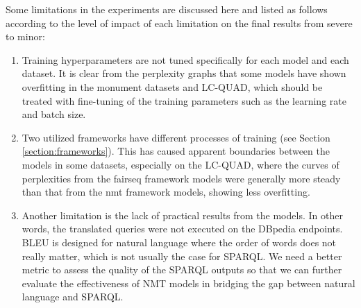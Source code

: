 Some limitations in the experiments are discussed here and listed as follows according to the level of impact of each limitation on the final results from severe to minor:
\begin{enumerate}
\item Training hyperparameters are not tuned specifically for each model and each dataset. It is clear from the perplexity graphs that some models have shown overfitting in the monument datasets and LC-QUAD, which should be treated with fine-tuning of the training parameters such as the learning rate and batch size.
\item Two utilized frameworks have different processes of training (see Section \ref{section:frameworks}). This has caused apparent boundaries between the models in some datasets, especially on the LC-QUAD, where the curves of perplexities from the fairseq framework models were generally more steady than that from the nmt framework models, showing less overfitting. 
\item Another limitation is the lack of practical results from the models. In other words, the translated queries were not executed on the DBpedia endpoints. BLEU is designed for natural language where the order of words does not really matter, which is not usually the case for SPARQL. We need a better metric to assess the quality of the SPARQL outputs so that we can further evaluate the effectiveness of NMT models in bridging the gap between natural language and SPARQL.
\end{enumerate}


